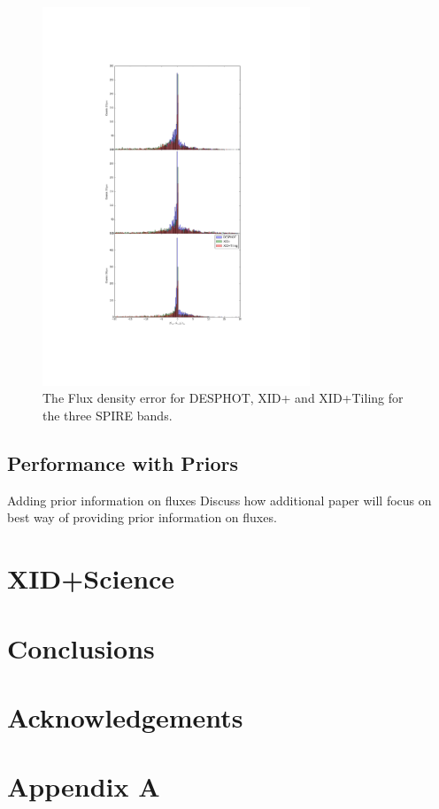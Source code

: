 \documentclass[useAMS,usenatbib]{mn2e}
\begin{document}
\begin{figure}
\includegraphics[width=8cm]{./Figures/Flux_density_error}
\caption{The Flux density error for DESPHOT, XID+ and XID+Tiling for the three SPIRE bands.}\label{Fig:flux_density_error}
\end{figure}

\subsection{Performance with Priors}
Adding prior information on fluxes 
Discuss how additional paper will focus on best way of providing prior information on fluxes.


\section{XID+Science}
\section{Conclusions}



\section*{Acknowledgements} %
%
%
%

\appendix
\section*{Appendix A}\label{Stan_model}
\onecolumn

%
%
%
%
%
%
%
\end{document}
